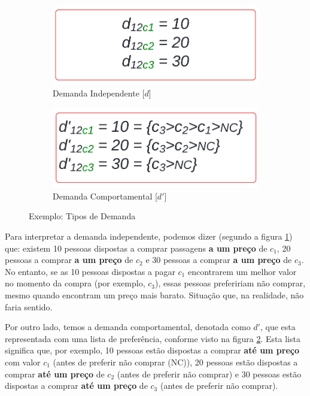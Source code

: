 \begin{figure}[H]
	\centering
	\begin{subfigure}[b]{0.40\linewidth}
		\includegraphics[width=\linewidth]{img/dem_indepen.png}
		\caption{Demanda Independente [$d$]}
		\label{fig:dem_indepen}
	\end{subfigure}\hspace{5mm}
	\begin{subfigure}[b]{0.40\linewidth}
		\includegraphics[width=\linewidth]{img/dem_compo.png}
		\caption{Demanda Comportamental [$d'$]}
		\label{fig:dem_comporta}
	\end{subfigure}
	\caption{Exemplo: Tipos de Demanda}
	\label{fig: tipos_demanda}
\end{figure}


Para interpretar a demanda independente, podemos dizer (segundo a figura \ref{fig:dem_indepen}) que: existem 10 pessoas dispostas a comprar passagens \textbf{a um preço} de $c_1$, 20 pessoas a comprar \textbf{a um preço} de $c_2$ e 30 pessoas a comprar \textbf{a um preço} de $c_3$. No entanto, se as 10 pessoas dispostas a pagar $c_1$ encontrarem um melhor valor no momento da compra (por exemplo, $c_3$), essas pessoas prefeririam não comprar, mesmo quando encontram um preço mais barato. Situação que, na realidade, não faria sentido.

Por outro lado, temos a demanda comportamental, denotada como $d'$, que esta representada com uma lista de preferência, conforme visto na figura \ref{fig:dem_comporta}. Esta lista significa que, por exemplo, 10 pessoas estão dispostas a comprar \textbf{até um preço} com valor $c_1$ (antes de preferir não comprar (NC)), 20 pessoas estão dispostas a comprar \textbf{até um preço} de $c_2$  (antes de preferir não comprar) e 30 pessoas estão dispostas a comprar \textbf{até um preço} de $c_3$  (antes de preferir não comprar).

